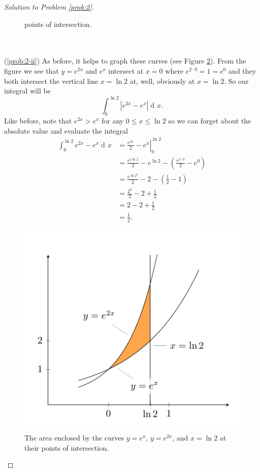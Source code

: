 \documentclass[12pt]{article}
\theoremstyle{plain}
\theoremstyle{definition}
\theoremstyle{remark}
\DeclareMathOperator{\diff}{d\!}
\begin{document}
\begin{proof}[Solution to Problem \ref{prob:2}]
\begin{figure}[h]
{ points of intersection.}
 \label{fig:area-1}
\end{figure}
\\\\
(\ref{prob:2-ii}) As before, it helps to graph these curves (see Figure
\ref{fig:area-2}). From the figure we see that $y=e^{2x}$ and $e^{x}$
intersect at $x=0$ where $e^{2\cdot 0}=1=e^0$ and they both intersect the
vertical line $x=\ln 2$ at, well, obviously at $x=\ln 2$. So our integral
will be
\[
\int_0^{\ln 2}\left|e^{2x}-e^x\right|\diff x.
\]
Like before, note that $e^{2x}>e^x$ for any $0\leq x\leq \ln 2$ so we can
forget about the absolute value and evaluate the integral
\begin{align*}
\int_0^{\ln 2}e^{2x}-e^x\diff x
&=\left.\frac{e^{2x}}{2}-e^x\right|_0^{\ln 2}\\
&=\frac{e^{2\ln 2}}{2}-e^{\ln 2}-\left(\frac{e^{2\cdot 0}}{2}-e^{0} \right)\\
&=\frac{e^{\ln 2^2}}{2}-2-\left(\frac{1}{2}-1\right)\\
&=\frac{2^2}{2}-2+\frac{1}{2}\\
&=2-2+\frac{1}{2}\\
&=\boxed{\frac{1}{2}.}
\end{align*}
\begin{figure}[h]
\centering
\includegraphics{../figures/quiz-3-2}
\caption{The area enclosed by the curves $y=e^x$, $y=e^{2x}$, and $x=\ln 2$
  at their points of intersection.}
 \label{fig:area-2}
\end{figure}
\end{proof}
\end{document}
